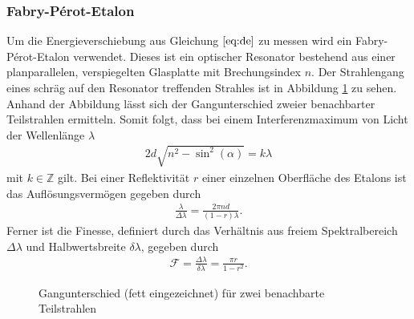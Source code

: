 \subsubsection{Fabry-Pérot-Etalon}
Um die Energieverschiebung aus Gleichung $\ref{eq:de}$ zu messen wird ein Fabry-Pérot-Etalon verwendet. Dieses ist ein optischer Resonator bestehend aus einer planparallelen, verspiegelten Glasplatte mit Brechungsindex $n$. Der Strahlengang eines schräg auf den Resonator treffenden Strahles ist in Abbildung \ref{fig:fabry} zu sehen. Anhand der Abbildung lässt sich der Gangunterschied zweier benachbarter Teilstrahlen ermitteln. Somit folgt, dass bei einem Interferenzmaximum von Licht der Wellenlänge $\lambda$
\begin{align*}
  2d\sqrt{n^2-\sin^2(\alpha)}=k\lambda
\end{align*}
mit $k \in \mathbb{Z}$ gilt. Bei einer Reflektivität $r$ einer einzelnen Oberfläche des Etalons ist das Auflösungsvermögen gegeben durch
\begin{align*}
  \frac{\lambda}{\Delta \lambda}=\frac{2 \pi n d}{(1-r)\lambda}.
\end{align*}
Ferner ist die Finesse, definiert durch das Verhältnis aus freiem Spektralbereich $\Delta \lambda$ und Halbwertsbreite $\delta \lambda$, gegeben durch
\begin{align*}
  \mathcal{F}=\frac{\Delta \lambda}{\delta \lambda}=\frac{\pi r}{1-r^2}.
\end{align*} 

\begin{figure}[h]
  \centering
  \caption{Gangunterschied (fett eingezeichnet) für zwei benachbarte Teilstrahlen}
  \label{fig:fabry}
\end{figure}
